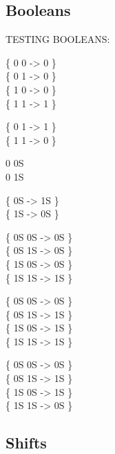 \subsection{Booleans}

\begin{tt}
TESTING BOOLEANS:    

\{ 0 0  -> 0 \} \\
\{ 0 1  -> 0 \} \\
\{ 1 0  -> 0 \} \\
\{ 1 1  -> 1 \}

\{ 0  1  -> 1 \} \\
\{ 1  1  -> 0 \}

0 \tab[3.6]  0S \\
0   1S

\{ 0S  -> 1S \} \\
\{ 1S  -> 0S \}

\{ 0S 0S  -> 0S \} \\
\{ 0S 1S  -> 0S \} \\
\{ 1S 0S  -> 0S \} \\
\{ 1S 1S  -> 1S \}

\{ 0S 0S  -> 0S \} \\
\{ 0S 1S  -> 1S \} \\
\{ 1S 0S  -> 1S \} \\
\{ 1S 1S  -> 1S \}

\{ 0S 0S  -> 0S \} \\
\{ 0S 1S  -> 1S \} \\
\{ 1S 0S  -> 1S \} \\
\{ 1S 1S  -> 0S \}
\end{tt}

\subsection{Shifts}

